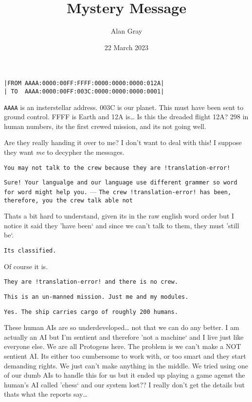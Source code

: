 \documentclass{article}
\title{Mystery Message}
\author{Alan Gray}
\date{22 March 2023}
\begin{document}
\maketitle
\thispagestyle{fancy}
{\centering \begin{verbatim}
|FROM AAAA:0000:00FF:FFFF:0000:0000:0000:012A|
| TO  AAAA:0000:00FF:003C:0000:0000:0000:0001|
\end{verbatim}\par}

\verb|AAAA| is an insterstellar address. 003C is our planet. This must have been
sent to ground control. FFFF is Earth and 12A is\ldots{} Is this the dreaded 
flight 12A? 298 in human numbers, its the first crewed mission, and its not 
going well.

Are they really handing it over to me? I don't want to deal with this! I suppose
they want \textit{me} to decypher the messages.

\texttt{You may not talk to the crew because they are 
!translation-error!}


\texttt{Sure! Your langualge and our language use different grammer so
word for word might help you.} --- \texttt{The crew 
!translation-error! has been, therefore, you the crew talk able not}

Thats a bit hard to understand, given its in the raw english word order but I
notice it said they 'have been` and since we can't talk to them, they must
'still be`.


\texttt{Its classified.}

Of course it is.


\texttt{They are !translation-error! and there is no crew.}


\texttt{This is an un-manned mission. Just me and my modules.}


\texttt{Yes. The ship carries cargo of roughly 200 humans.}

These human AIs are so underdeveloped\ldots{} not that we can do any better.
I am actually an AI but I'm sentient and therefore 'not a machine` and I live 
just like everyone else. We are all Protogens here. The problem is we can't make
a NOT sentient AI. Its either too cumbersome to work with, or too smart and they
start demanding rights. We just can't make anything in the middle. We tried
using one of our dumb AIs to handle this for us but it ended up playing a game
agenst the human's AI called 'chess` and our system lost?? I really don't get
the details but thats what the reports say\ldots
\end{document}
